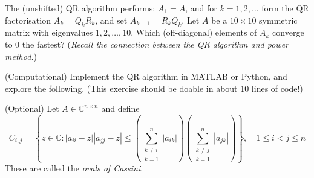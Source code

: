 \documentclass[answers]{exam}
\begin{document}
\begin{questions}
\question%
The (unshifted) QR algorithm performs: $A_{1}=A$, and for $k=1,2, \ldots$ form the QR factorisation $A_{k}=Q_{k} R_{k}$, and set $A_{k+1}=R_{k} Q_{k}$. Let $A$ be a $10 \times 10$ symmetric matrix with eigenvalues $1,2, \ldots, 10$. Which (off-diagonal) elements of $A_{k}$ converge to 0 the fastest? (\emph{Recall the connection between the QR algorithm and power method.})



\question%
(Computational) Implement the QR algorithm in MATLAB or Python, and explore the following. (This exercise should be doable in about 10 lines of code!)



\question%
(Optional) Let $A \in \mathbb{C}^{n \times n}$ and define \[
	C_{i, j}=\left\{z \in \mathbb{C}: |a_{i i}-z| |a_{j j}-z| \leq \left(\sum_{\substack{k \neq i \\ k=1}}^{n}\left|a_{i k}\right|\right)\left(\sum_{\substack{k \neq j \\ k=1}}^{n}|a_{j k}|\right)\right\},\quad
	1 \leq i<j \leq n
\] These are called the \emph{ovals of Cassini}.

\end{questions}
\end{document}
